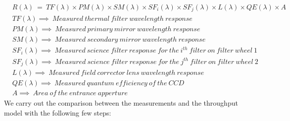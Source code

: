 \documentclass[12pt]{spieman}  %
\begin{document}
 \begin{align*}
     & R(\lambda)~=~TF(\lambda)\times PM(\lambda)\times SM(\lambda)\times SF_{i}(\lambda)\times SF_{j}(\lambda)\times L(\lambda)\times QE(\lambda)\times A\\
     & TF(\lambda)\implies~Measured~thermal~filter~wavelength~response \\
     & PM(\lambda)\implies~Measured~primary~mirror~wavelength~response \\
     & SM(\lambda)\implies~Measured~secondary~mirror~wavelength~response \\
     & SF_{i}(\lambda)\implies~Measured~science~filter~response~for~the~i^{th}~filter~on~filter~wheel~1 \\
     & SF_{j}(\lambda)\implies~Measured~science~filter~response~for~the~j^{th}~filter~on~filter~wheel~2  \\
     & L(\lambda)\implies~Measured~field~corrector~lens~wavelength~response \\
     & QE(\lambda)\implies~Measured~quantum~efficiency~of~the~CCD \\
     & A\implies~Area~of~the~entrance~apperture
 \end{align*}
 We carry out the comparison between the measurements and the throughput model with the following few steps:
\end{document}
